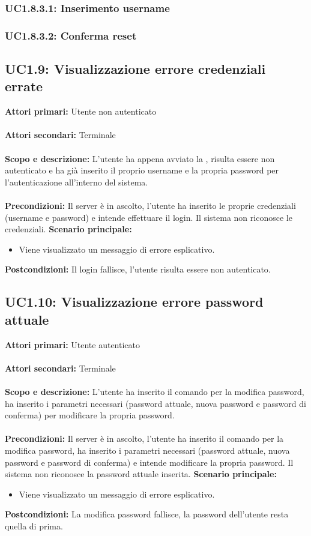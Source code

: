 \documentclass{scalatekids-article}
\begin{document}
\subsubsection{UC1.8.3.1: Inserimento username}

\subsubsection{UC1.8.3.2: Conferma reset}

\subsection{UC1.9: Visualizzazione errore credenziali errate}

\textbf{Attori primari:} Utente non autenticato\\ \\
\textbf{Attori secondari:} Terminale\\ \\
\textbf{Scopo e descrizione:}
L'utente ha appena avviato la , risulta essere non autenticato e ha già inserito il proprio username e la propria password per l'autenticazione all'interno del sistema.\\ \\
\textbf{Precondizioni:} Il server è in ascolto, l'utente ha inserito le proprie credenziali (username e password) e intende effettuare il login. Il sistema non riconosce le credenziali.
\textbf{Scenario principale:}
\begin{itemize}
  \item Viene visualizzato un messaggio di errore esplicativo.
\end{itemize}
\textbf{Postcondizioni:} Il login fallisce, l'utente risulta essere non autenticato.

\subsection{UC1.10: Visualizzazione errore password attuale}

\textbf{Attori primari:} Utente autenticato\\ \\
\textbf{Attori secondari:} Terminale\\ \\
\textbf{Scopo e descrizione:}
L'utente ha inserito il comando per la modifica password, ha inserito i parametri necessari (password attuale, nuova password e password di conferma) per modificare la propria password.\\ \\
\textbf{Precondizioni:} Il server è in ascolto, l'utente ha inserito il comando per la modifica password, ha inserito i parametri necessari (password attuale, nuova password e password di conferma) e intende modificare la propria password. Il sistema non riconosce la password attuale inserita.
\textbf{Scenario principale:}
\begin{itemize}
  \item Viene visualizzato un messaggio di errore esplicativo.
\end{itemize}
\textbf{Postcondizioni:} La modifica password fallisce, la password dell'utente resta quella di prima.
\end{document}
